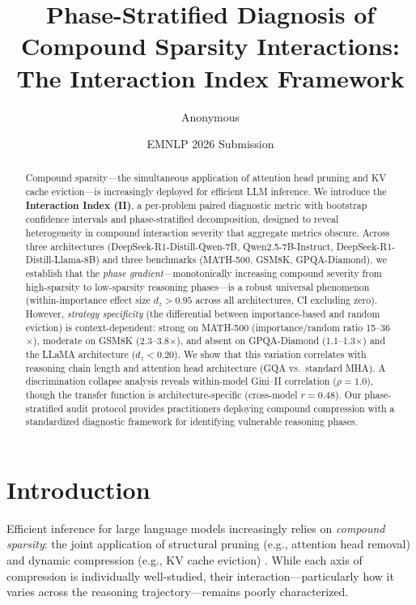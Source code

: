\documentclass[11pt,a4paper]{article}
\title{Phase-Stratified Diagnosis of Compound Sparsity Interactions:\\The Interaction Index Framework}
\author{Anonymous}
\date{EMNLP 2026 Submission}
\begin{document}
\maketitle

\begin{abstract}
Compound sparsity---the simultaneous application of attention head pruning and KV cache eviction---is increasingly deployed for efficient LLM inference.
We introduce the \textbf{Interaction Index (II)}, a per-problem paired diagnostic metric with bootstrap confidence intervals and phase-stratified decomposition, designed to reveal heterogeneity in compound interaction severity that aggregate metrics obscure.
Across three architectures (DeepSeek-R1-Distill-Qwen-7B, Qwen2.5-7B-Instruct, DeepSeek-R1-Distill-Llama-8B) and three benchmarks (MATH-500, GSM8K, GPQA-Diamond), we establish that the \emph{phase gradient}---monotonically increasing compound severity from high-sparsity to low-sparsity reasoning phases---is a robust universal phenomenon (within-importance effect size $d_z > 0.95$ across all architectures, CI excluding zero).
However, \emph{strategy specificity} (the differential between importance-based and random eviction) is context-dependent: strong on MATH-500 (importance/random ratio 15--36$\times$), moderate on GSM8K (2.3--3.8$\times$), and absent on GPQA-Diamond (1.1--1.3$\times$) and the LLaMA architecture ($d_z < 0.20$).
We show that this variation correlates with reasoning chain length and attention head architecture (GQA vs.\ standard MHA).
A discrimination collapse analysis reveals within-model Gini--II correlation ($\rho = 1.0$), though the transfer function is architecture-specific (cross-model $r = 0.48$).
Our phase-stratified audit protocol provides practitioners deploying compound compression with a standardized diagnostic framework for identifying vulnerable reasoning phases.
\end{abstract}

\section{Introduction}

Efficient inference for large language models increasingly relies on \emph{compound sparsity}: the joint application of structural pruning (e.g., attention head removal) and dynamic compression (e.g., KV cache eviction) \cite{spark2024,slim2024}. While each axis of compression is individually well-studied, their interaction---particularly how it varies across the reasoning trajectory---remains poorly characterized.
\end{document}
